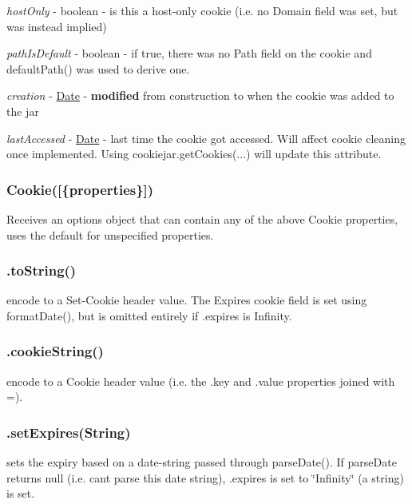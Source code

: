 \begin{DoxyItemize}
\item {\itshape host\+Only} -\/ boolean -\/ is this a host-\/only cookie (i.\+e. no Domain field was set, but was instead implied)
\item {\itshape path\+Is\+Default} -\/ boolean -\/ if true, there was no Path field on the cookie and {\ttfamily default\+Path()} was used to derive one.
\item {\itshape creation} -\/ {\ttfamily \mbox{\hyperlink{classDate}{Date}}} -\/ {\bfseries modified} from construction to when the cookie was added to the jar
\item {\itshape last\+Accessed} -\/ {\ttfamily \mbox{\hyperlink{classDate}{Date}}} -\/ last time the cookie got accessed. Will affect cookie cleaning once implemented. Using {\ttfamily cookiejar.\+get\+Cookies(...)} will update this attribute.
\end{DoxyItemize}

\subsubsection*{{\ttfamily Cookie(\mbox{[}\{properties\}\mbox{]})}}

Receives an options object that can contain any of the above Cookie properties, uses the default for unspecified properties.

\subsubsection*{{\ttfamily .to\+String()}}

encode to a Set-\/\+Cookie header value. The Expires cookie field is set using {\ttfamily format\+Date()}, but is omitted entirely if {\ttfamily .expires} is {\ttfamily Infinity}.

\subsubsection*{{\ttfamily .cookie\+String()}}

encode to a Cookie header value (i.\+e. the {\ttfamily .key} and {\ttfamily .value} properties joined with \textquotesingle{}=\textquotesingle{}).

\subsubsection*{{\ttfamily .set\+Expires(\+String)}}

sets the expiry based on a date-\/string passed through {\ttfamily parse\+Date()}. If parse\+Date returns {\ttfamily null} (i.\+e. can\textquotesingle{}t parse this date string), {\ttfamily .expires} is set to {\ttfamily \char`\"{}\+Infinity\char`\"{}} (a string) is set.


